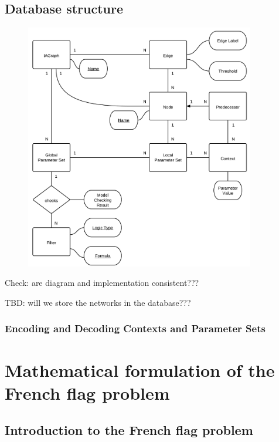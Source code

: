 \documentclass{article}
\begin{document}
\begin{flushleft}
\subsection{Database structure}

\begin{figure}[h!]
\centering 
\includegraphics[width=10cm]{ERDiagramRegNetTool.png}
\end{figure}

Check: are diagram and implementation consistent???

TBD: will we store the networks in the database???

\subsubsection{Encoding and Decoding Contexts and Parameter Sets}

\section{Mathematical formulation of the French flag problem}

\subsection{Introduction to the French flag problem}


\end{flushleft}
\end{document}
